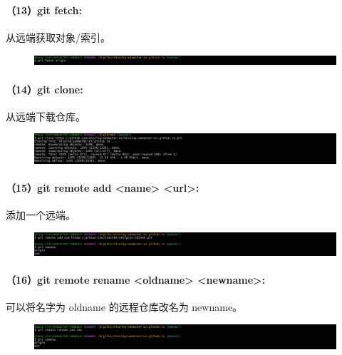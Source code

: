 \documentclass[a4paper, 12pt]{article}
\begin{document}
	\paragraph{（13）git fetch:}	
	从远端获取对象/索引。
	
	\begin{figure}[H]
		\centering
		\includegraphics[width=1\textwidth]{029.jpg}
	\end{figure}
	
	\paragraph{（14）git clone:}	
	从远端下载仓库。
	
	\begin{figure}[H]
		\centering
		\includegraphics[width=1\textwidth]{030.jpg}
	\end{figure}
	
	\paragraph{（15）git remote add <name> <url>:}	
	添加一个远端。
	
	\begin{figure}[H]
		\centering
		\includegraphics[width=1\textwidth]{031.jpg}
	\end{figure}
	
	\paragraph{（16）git remote rename <oldname> <newname>:}
	可以将名字为 oldname 的远程仓库改名为 newname。	
	
	\begin{figure}[H]
		\centering
		\includegraphics[width=1\textwidth]{032.jpg}
	\end{figure}
	
\end{document}
